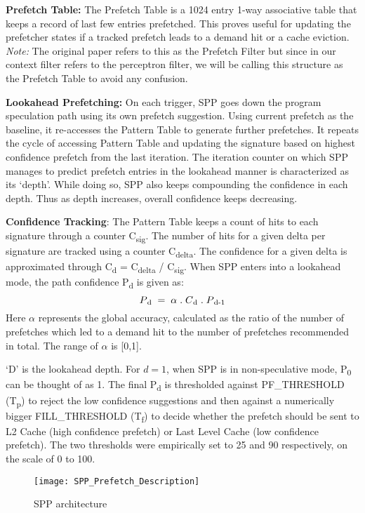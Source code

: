 \textbf{Prefetch Table:} The Prefetch Table is a 1024 entry 1-way associative table that
keeps a record of last few entries prefetched.  This proves useful for
updating the prefetcher states if a tracked prefetch leads to a demand hit or
a cache eviction. \textit{Note:} The original paper refers to this as the Prefetch Filter 
but since in our context filter refers to the perceptron filter, we will be calling 
this structure as the Prefetch Table to avoid any confusion.

\textbf{Lookahead Prefetching:} On each trigger, SPP goes down
the program speculation path using its own prefetch suggestion.
Using current prefetch as the baseline, it re-accesses the Pattern Table to generate further
prefetches. It repeats the cycle of accessing Pattern Table and
updating the signature based on highest confidence prefetch from the
last iteration.  The iteration counter on which SPP manages to
predict prefetch entries in the lookahead manner is characterized as
its `depth'.  While doing so, SPP also keeps compounding the
confidence in each depth.  Thus as depth increases, overall confidence
keeps decreasing.  

\textbf{Confidence Tracking}: The Pattern Table keeps a count of hits to each
signature through a counter C\textsubscript{sig}.  The number of hits
for a given delta per signature are tracked using a counter
C\textsubscript{delta}.  The confidence for a given delta is
approximated through C\textsubscript{d} = C\textsubscript{delta} /
C\textsubscript{sig}.  When SPP enters into a lookahead mode, the path
confidence P\textsubscript{d} is given as:
$$P\textsubscript{d} \;=\; \alpha  \;.\;  C\textsubscript{d}  \;.\;  P\textsubscript{d-1}$$ 
Here $\alpha$ represents the global accuracy, calculated as the ratio of 
the number of prefetches which led to a demand hit to the number of 
prefetches recommended in total. The range of $\alpha$ is [0,1].

`D' is the lookahead depth. For $d = 1$, when SPP is in
non-speculative mode, P\textsubscript{0} can be thought of as 1. 
The final P\textsubscript{d} is thresholded against PF\_THRESHOLD 
(T\textsubscript{p}) to reject the low confidence suggestions and 
then against a numerically bigger FILL\_THRESHOLD (T\textsubscript{f}) to 
decide whether the prefetch should be sent to L2 Cache 
(high confidence prefetch) or Last Level Cache (low confidence prefetch).
The two thresholds were empirically set to 25 and 90 respectively, 
on the scale of 0 to 100.  

\begin{figure}
  \begin{center}
  \texttt{[image: SPP\_Prefetch\_Description]}
    \label{fig:spp_strcture}
  \caption{SPP architecture}
  \end{center}
\end{figure}


